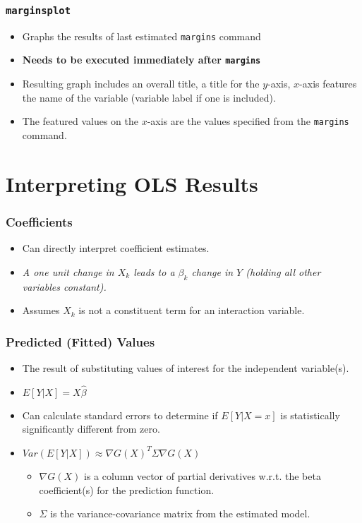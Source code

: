 \documentclass{beamer}
\begin{document}
\begin{frame}
	\frametitle{\texttt{marginsplot}}
	\begin{itemize}
		\item Graphs the results of last estimated \texttt{margins} command
		\item \textbf{Needs to be executed immediately after \texttt{margins}}
		\item Resulting graph includes an overall title, a title for the $y$-axis, $x$-axis features the name of the variable (variable label if one is included).
		\item The featured values on the $x$-axis are the values specified from the \texttt{margins} command.
	\end{itemize}
\end{frame}

\section{Interpreting OLS Results}

\begin{frame}
	\frametitle{Coefficients}
	\begin{itemize}
		\item Can directly interpret coefficient estimates.
		\item \textit{A one unit change in $X_{k}$ leads to a $\beta_{k}$ change in $Y$ (holding all other variables constant).}
		\item Assumes $X_{k}$ is not a constituent term for an interaction variable. 
	\end{itemize}
\end{frame}

\begin{frame}
	\frametitle{Predicted (Fitted) Values}
	\begin{itemize}
		\item The result of substituting values of interest for the independent variable(s).
		\item $E[Y|X]=X\hat{\beta}$
		\item Can calculate standard errors to determine if $E[Y|X=x]$ is statistically significantly different from zero.
		\item $Var\left(E[Y|X]\right)\approx\nabla G(X)^{T}\Sigma\nabla G(X)$ 
		\begin{itemize}
			\item $\nabla G(X)$ is a column vector of partial derivatives w.r.t. the beta coefficient(s) for the prediction function.
			\item $\Sigma$ is the variance-covariance matrix from the estimated model.
		\end{itemize}
	\end{itemize}
\end{frame}
\end{document}
